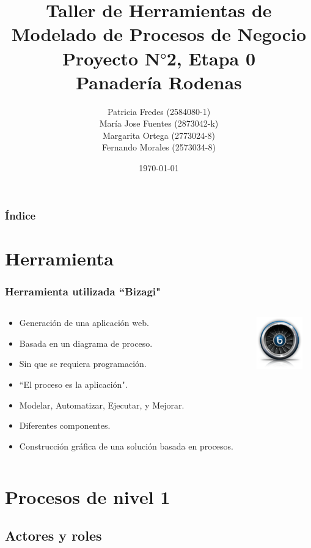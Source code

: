 \documentclass[10pt,letterpaper]{beamer}
\title{Taller de Herramientas de Modelado de Procesos de Negocio \\ Proyecto N$°$2, Etapa 0 \\ Panadería Rodenas}
\author{Patricia Fredes (2584080-1) \\ María Jose Fuentes (2873042-k) \\ Margarita Ortega (2773024-8) \\ Fernando Morales (2573034-8)}
\date{\today}
\begin{document}
\begin{frame}
\titlepage %
\end{frame} 

\begin{frame}
\frametitle{Índice}
\tableofcontents
\end{frame} 

\section{Herramienta}

\begin{frame}
\frametitle{Herramienta utilizada ``Bizagi"}
\begin{columns}
\begin{column}{10cm}
\begin{itemize}
\item Generación de una aplicación web. 
\item Basada en un diagrama de proceso.
\item Sin que se requiera programación.
\item ``El proceso es la aplicación". 
\item Modelar, Automatizar, Ejecutar, y Mejorar.
\item Diferentes componentes.
\item Construcción gráfica de una solución basada en procesos.
\end{itemize}
\vspace{1cm} 
\end{column}
\begin{column}{5cm}
\begin{overprint}
\includegraphics[width=2cm]{./imagenes/biz.png}
\end{overprint}
\end{column}
\end{columns}
\end{frame}


\section{Procesos de nivel 1}
\subsection{Actores y roles}
\end{document}
